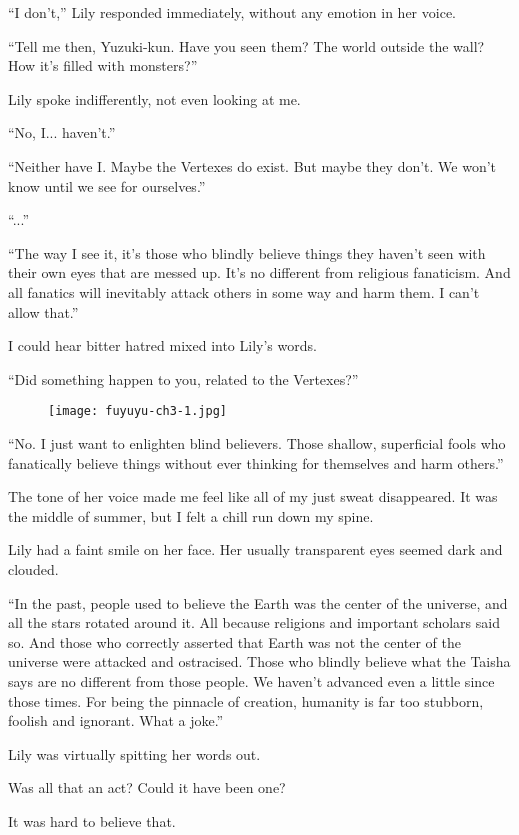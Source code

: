 ``I don't,'' Lily responded immediately, without any emotion in her voice.

``Tell me then, Yuzuki-kun. Have you seen them? The world outside the wall? How it's filled with monsters?''

Lily spoke indifferently, not even looking at me.

``No, I... haven't.''

``Neither have I. Maybe the Vertexes do exist. But maybe they don't. We won't know until we see for ourselves.''

``...''

``The way I see it, it's those who blindly believe things they haven't seen with their own eyes that are messed up. It's no different from religious fanaticism. And all fanatics will inevitably attack others in some way and harm them. I can't allow that.''

I could hear bitter hatred mixed into Lily's words.

``Did something happen to you, related to the Vertexes?''

\begin{figure}[p]
\texttt{[image: fuyuyu-ch3-1.jpg]}
\end{figure}

``No. I just want to enlighten blind believers. Those shallow, superficial fools who fanatically believe things without ever thinking for themselves and harm others.''

The tone of her voice made me feel like all of my just sweat disappeared. It was the middle of summer, but I felt a chill run down my spine.

Lily had a faint smile on her face. Her usually transparent eyes seemed dark and clouded.

``In the past, people used to believe the Earth was the center of the universe, and all the stars rotated around it. All because religions and important scholars said so. And those who correctly asserted that Earth was not the center of the universe were attacked and ostracised. Those who blindly believe what the Taisha says are no different from those people. We haven't advanced even a little since those times. For being the pinnacle of creation, humanity is far too stubborn, foolish and ignorant. What a joke.''

Lily was virtually spitting her words out.

Was all that an act? Could it have been one?

It was hard to believe that.


